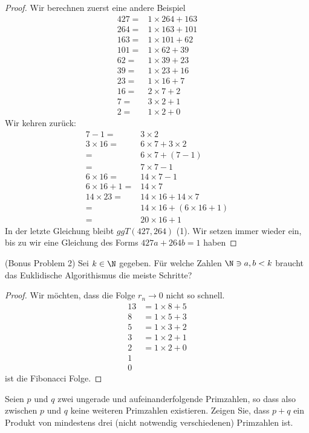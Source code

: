 \begin{proof}
	Wir berechnen zuerst eine andere Beispiel
	\begin{align*}
		427=&1\times 264+163\\
		264=&1\times 163+101\\
		163=&1\times 101+62\\
		101=&1\times 62+39\\
		62=&1\times 39+23\\
		39=&1\times 23+16\\
		23=&1\times 16+7\\
		16=&2\times 7+2\\
		7=&3\times 2+1\\
		2=&1\times 2 +0
	\end{align*}
	Wir kehren zur\"{u}ck:
	\begin{align*}
		7-1=&3\times 2\\
		3\times 16=&6\times 7 +3\times 2\\
		=&6\times 7+(7 - 1)\\
		=&7\times 7-1\\
		6\times 16 =& 14\times 7-1\\
		6\times 16+1=& 14\times 7\\
		14\times 23 =& 14\times 16+14\times 7\\
		=& 14\times 16+(6\times 16+1)\\
		=& 20\times 16 +1
	\end{align*}
	In der letzte Gleichung bleibt $ggT(427,264)$ (1). Wir setzen immer wieder ein, bis zu wir eine Gleichung des Forms $427a+264b=1$ haben
\end{proof}
\begin{Problem}
	(Bonus Problem 2) Sei $k\in\N$ gegeben. F\"{u}r welche Zahlen $\N\ni a,b<k$ braucht das Euklidische Algorithismus die meiste Schritte?
\end{Problem}
\begin{proof}
Wir möchten, dass die Folge $r_n\to 0$ nicht so schnell. 
	\begin{align*}
		13&=1\times 8+5\\
		8&=1\times 5+3\\
		5&=1\times 3 +2\\
		3&=1\times 2 +1\\
		2&=1\times 2+0\\
		1&\\
		0&
	\end{align*}
	ist die Fibonacci Folge.
\end{proof}
\begin{Problem}
	Seien $p$ und $q$ zwei ungerade und aufeinanderfolgende Primzahlen, so dass also zwischen $p$ und $q$ keine weiteren Primzahlen existieren. Zeigen Sie, dass $p + q$ ein Produkt von mindestens drei (nicht notwendig verschiedenen) Primzahlen ist.
\end{Problem}

